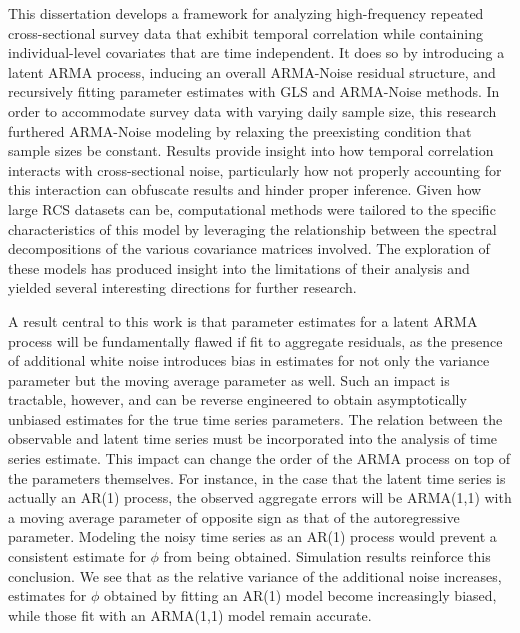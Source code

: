 This dissertation develops a framework for analyzing high-frequency repeated cross-sectional survey data that exhibit temporal correlation while containing individual-level covariates that are time independent. It does so by introducing a latent ARMA process, inducing an overall ARMA-Noise residual structure, and recursively fitting parameter estimates with GLS and ARMA-Noise methods. In order to accommodate survey data with varying daily sample size, this research furthered ARMA-Noise modeling by relaxing the preexisting condition that sample sizes be constant. Results provide insight into how temporal correlation interacts with cross-sectional noise, particularly how not properly accounting for this interaction can obfuscate results and hinder proper inference. Given how large RCS datasets can be, computational methods were tailored to the specific characteristics of this model by leveraging the relationship between the spectral decompositions of the various covariance matrices involved. The exploration of these models has produced insight into the limitations of their analysis and yielded several interesting directions for further research.

A result central to this work is that parameter estimates for a latent ARMA process will be fundamentally flawed if fit to aggregate residuals, as the presence of additional white noise introduces bias in estimates for not only the variance parameter but the moving average parameter as well. Such an impact is tractable, however, and can be reverse engineered to obtain asymptotically unbiased estimates for the true time series parameters. The relation between the observable and latent time series must be incorporated into the analysis of time series estimate. This impact can change the order of the ARMA process on top of the parameters themselves. For instance, in the case that the latent time series is actually an AR(1) process, the observed aggregate errors will be ARMA(1,1) with a moving average parameter of opposite sign as that of the autoregressive parameter. Modeling the noisy time series as an AR(1) process would prevent a consistent estimate for $\phi$ from being obtained. Simulation results reinforce this conclusion. We see that as the relative variance of the additional noise increases, estimates for $\phi$ obtained by fitting an AR(1) model become increasingly biased, while those fit with an ARMA(1,1) model remain accurate.



